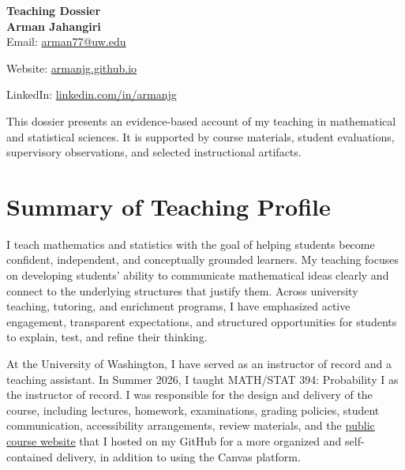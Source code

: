 \documentclass[11pt]{article}
\begin{document}

\begin{center}

{\LARGE\textbf{Teaching Dossier}}\\[6pt]

{\Large\textbf{Arman Jahangiri}}\\[4pt]

Email:
\href{mailto:arman77@uw.edu}
{arman77@uw.edu}


Website:
\href{https://armanjg.github.io}
{armanjg.github.io}



LinkedIn:
\href{https://www.linkedin.com/in/armanjg}
{linkedin.com/in/armanjg}

\end{center}

\vspace{8pt}

\noindent

This dossier presents an evidence-based account of my teaching
in mathematical and statistical sciences.
It is supported by course materials,
student evaluations,
supervisory observations,
and selected instructional artifacts.

\vspace{10pt}

\tableofcontents

\newpage


\section{Summary of Teaching Profile}

I teach mathematics and statistics with the goal of helping
students become confident, independent, and conceptually
grounded learners.
My teaching focuses on developing students' ability to communicate mathematical ideas clearly
and connect to the underlying structures that
justify them.
Across university teaching, tutoring, and enrichment programs,
I have emphasized active engagement,
transparent expectations,
and structured opportunities for students to explain,
test, and refine their thinking.

At the University of Washington, I have served as an
instructor of record and a teaching assistant.
In Summer 2026, I taught
{MATH/STAT 394: Probability I} as the instructor of record.
I was responsible for the design and delivery of the
course, including lectures,  homework, examinations,
grading policies, student communication, accessibility
arrangements, review materials, and the {\href{https://armanjg.github.io/MATH-394-Probability-1-v2/}{public course website}} that I hosted on my GitHub for a more organized and self-contained delivery, in addition to using the Canvas platform.
\end{document}
